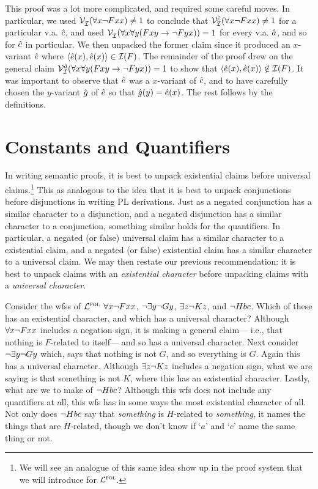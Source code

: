 This proof was a lot more complicated, and required some careful moves.
In particular, we used $\mathcal{V}_{\mathcal{I}}^{}(\forall x\neg Fxx)\neq 1$  to conclude that $\mathcal{V}_{\mathcal{I}}^{\hat{c}}(\forall x\neg Fxx)\neq 1$ for a particular v.a. $\hat{c}$, and used $\mathcal{V}_{\mathcal{I}}^{}(\forall x\forall y(Fxy \rightarrow \neg Fyx))=1$ for every v.a. $\hat{a}$, and so for $\hat{c}$ in particular. 
We then unpacked the former claim since it produced an $x$-variant $\hat{e}$ where $\langle\hat{e}(x),\hat{e}(x)\rangle\in\mathcal{I}(F)$.
The remainder of the proof drew on the general claim $\mathcal{V}_{\mathcal{I}}^{\hat{a}}(\forall x\forall y(Fxy \rightarrow \neg Fyx))=1$ to show that $\langle\hat{e}(x),\hat{e}(x)\rangle\notin\mathcal{I}(F)$.  
It was important to observe that $\hat{e}$ was a $x$-variant of $\hat{c}$, and to have carefully chosen the $y$-variant $\hat{g}$ of $\hat{e}$ so that $\hat{g}(y)=\hat{e}(x)$.
The rest follows by the definitions.





\section{Constants and Quantifiers}

In writing semantic proofs, it is best to unpack existential claims before universal claims.\footnote{We will see an analogue of this same idea show up in the proof system that we will introduce for $\mathcal{L}^{\textsc{fol}}$.}
This as analogous to the idea that it is best to unpack conjunctions before disjunctions in writing PL derivations.
Just as a negated conjunction has a similar character to a disjunction, and a negated disjunction has a similar character to a conjunction, something similar holds for the quantifiers.
In particular, a negated (or false) universal claim has a similar character to a existential claim, and a negated (or false) existential claim has a similar character to a universal claim. 
We may then restate our previous recommendation: it is best to unpack claims with an \textit{existential character} before unpacking claims with a \textit{universal character}.

Consider the wfss of $\mathcal{L}^{\textsc{fol}}$ $\forall x\neg Fxx$, $\neg \exists y \neg Gy$, $\exists z \neg Kz$, and $\neg Hbc$.
Which of these has an existential character, and which has a universal character?
Although $\forall x\neg Fxx$ includes a negation sign, it is making a general claim--- i.e., that nothing is $F$-related to itself--- and so has a universal character.
Next consider $\neg \exists y \neg Gy$ which, says that nothing is not $G$, and so everything is $G$.
Again this has a universal character.
Although $\exists z \neg Kz$ includes a negation sign, what we are saying is that something is not $K$, where this has an existential character. 
Lastly, what are we to make of $\neg Hbc$?
Although this wfs does not include any quantifiers at all, this wfs has in some ways the most existential character of all.
Not only does $\neg Hbc$ say that \textit{something} is $H$-related to \textit{something}, it names the things that are $H$-related, though we don't know if `$a$' and `$c$' name the same thing or not.

